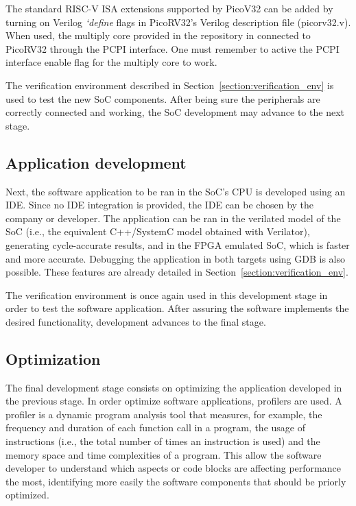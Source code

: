 The standard RISC-V ISA extensions supported by PicoV32 can be added by turning on Verilog \textit{`define} flags in PicoRV32's Verilog description file (picorv32.v). When used, the multiply core provided in the repository in connected to PicoRV32 through the PCPI interface. One must remember to active the PCPI interface enable flag for the multiply core to work.


The verification environment described in Section~\ref{section:verification_env} is used to test the new SoC components. After being sure the peripherals are correctly connected and working, the SoC development may advance to the next stage.

\subsection{Application development}
Next, the software application to be ran in the SoC's CPU is developed using an IDE. Since no IDE integration is provided, the IDE can be chosen by the company or developer. The application can be ran in the verilated model of the SoC (i.e., the equivalent C++/SystemC model obtained with Verilator), generating cycle-accurate results, and in the FPGA emulated SoC, which is faster and more accurate. Debugging the application in both targets using GDB is also possible. These features are already detailed in Section~\ref{section:verification_env}.

The verification environment is once again used in this development stage in order to test the software application. After assuring the software implements the desired functionality, development advances to the final stage.

\subsection{Optimization}
The final development stage consists on optimizing the application developed in the previous stage. In order optimize software applications, profilers are used. A profiler is a dynamic program analysis tool that measures, for example, the frequency and duration of each function call in a program, the usage of instructions (i.e., the total number of times an instruction is used) and the memory space and time complexities of a program. This allow the software developer to understand which aspects or code blocks are affecting performance the most, identifying more easily the software components that should be priorly optimized.

